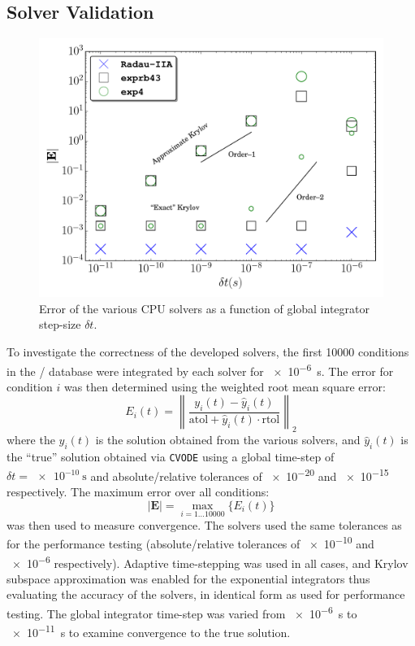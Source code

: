 \documentclass[final,twocolumn]{elsarticle}
\begin{document}
\subsection{Solver Validation}
\begin{figure}[htb]
  \ifmeasure
  \fontsize{8pt}{10pt}\selectfont
  \fi
  \centering
  \includegraphics[width=0.5\linewidth]{c_nco_nosmem_error.pdf}
  \caption{Error of the various CPU solvers as a function of global integrator step-size $\delta t$.}
  \label{F:convergence}
\end{figure}

To investigate the correctness of the developed solvers, the first \num{10000} conditions in the \slash{} database were integrated by each solver for \SI{e-6}{\second}.
The error for condition $i$ was then determined using the weighted root mean square error:
\begin{equation}
 E_i(t) = \left\lVert\frac{y_i(t) - \hat{y}_i(t)}{\text{atol} + \hat{y}_i(t) \cdot \text{rtol}}\right\rVert_2
\end{equation}
where the $y_i(t)$ is the solution obtained from the various solvers, and $\hat{y}_i(t)$ is the ``true'' solution obtained via \texttt{CVODE} using a global time-step of $\delta t = \SI{e-10}{\second}$ and absolute\slash relative tolerances of \num{e-20} and \num{e-15} respectively.
The maximum error over all conditions:
\begin{equation}
 \left\lvert\textbf{E}\right\rvert = \max_{i=\num{1}\dots\num{10000}}\{E_i(t)\}
\end{equation}
was then used to measure convergence.
The solvers used the same tolerances as for the performance testing (absolute\slash relative tolerances of \num{e-10} and \num{e-6} respectively).
Adaptive time-stepping was used in all cases, and Krylov subspace approximation was enabled for the exponential integrators thus evaluating the accuracy of the solvers, in identical form as used for performance testing.
The global integrator time-step was varied from \SI{e-6}{\second} to \SI{e-11}{\second} to examine convergence to the true solution.
\end{document}
